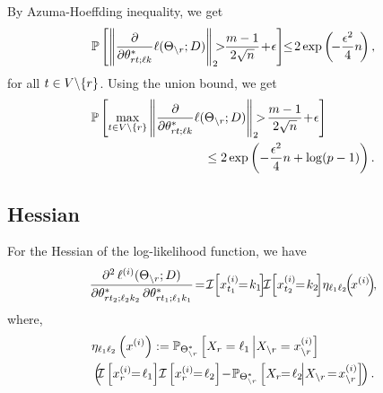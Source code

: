 By Azuma-Hoeffding inequality, we get
\begin{equation}
\mathbb{P}\left[\norm{\frac{\partial}{\partial\theta^*_{\svert t;\ell k}}\ell(\Theta_{\backslash \svert}; \Data)}{2}\!\!\!>\!\!\frac{m-1}{2\sqrt{n}}\!+\!\epsilon\right]\!\!\leq\! 2\exp\left(\!-\frac{\epsilon^2}{4}n\!\right),
\nonumber
\end{equation}
for all $t\in V\backslash\{r\}$. Using the union bound, we get
\begin{equation}
\begin{aligned}
&\mathbb{P}\left[\max_{t\in V\backslash\{r\}}\left\|\frac{\partial}{\partial\theta^*_{r t;\ell k}}\ell(\Theta_{\backslash r}; D)\right\|_{2}\!\!\!>\!\frac{m-1}{2\sqrt{n}}\!+\!\epsilon\right] \\&\qquad\qquad\qquad\qquad\quad\leq 2\exp\left(-\frac{\epsilon^2}{4}n+\log(p-1)\right).\\
\end{aligned}
\label{gradient_inf_2_bound}
\end{equation}

\subsection{Hessian}
\label{Hessian_Section}
\noindent For the Hessian of the log-likelihood function, we have
\begin{equation}
\frac{\partial^2\, \ell^{(i)}(\Theta_{\backslash \svert}; \Data)}{\partial\theta^*_{\svert t_2;\ell_2 k_2}\, \partial\theta^*_{\svert t_1;\ell_1 k_1}}\! =\! \I\!\left[x_{t_1}^{(i)}\!\!=\!k_1\!\right] \!\!\I\!\left[x_{t_2}^{(i)}\!\!=\!k_2\!\right]\! \eta_{\ell_1\ell_2}\!\!\left(\!x^{(i)}\!\right)\!\!,
\nonumber 
\end{equation}
where,
\begin{equation}
\begin{aligned}
&\eta_{\ell_1\ell_2}\left(x^{(i)}\right) \defn \mathbb{P}_{\Theta^*_{\backslash\svert}} \left[X_\svert = \ell_1 \, \Big| X_{\backslash \svert} =
x_{\backslash \svert}^{(i)}\right] \\ &\left(\!\!\I\left[x_\svert^{(i)}\!\!=\!\ell_1\right]\!\I\left[x_\svert^{(i)}\!\!=\!\ell_2\right] \!-\! \mathbb{P}_{\Theta^*_{\backslash\svert}} \left[X_\svert \!\!=\! \ell_2 \! \Big| X_{\backslash \svert}\! =\!
x_{\backslash \svert}^{(i)}\right]\!\right).\\
\end{aligned}
\nonumber
\end{equation}

